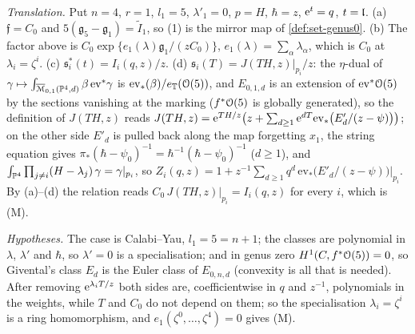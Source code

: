 \emph{Translation.} Put $n=4$, $r=1$, $l_1=5$, $\lambda'_1=0$, $p=H$, $\hbar=z$, $\mathrm{e}^t=q$, $t=\mathfrak{l}$. (a) $\mathfrak f=C_0$ and $5(\mathfrak g_5-\mathfrak g_1)=\tilde I_1$, so (1) is the mirror map of \cref{def:set-genus0}. (b) The factor above is $C_0\exp\{e_1(\lambda)\mathfrak g_1/(zC_0)\}$, $e_1(\lambda)=\sum_\alpha\lambda_\alpha$, which is $C_0$ at $\lambda_i=\zeta^i$. (c) $\mathfrak s_i^*(t)=I_i(q,z)/z$. (d) $\mathfrak s_i(T)=J(TH,z)|_{p_i}/z$: the $\eta$-dual of $\gamma\mapsto\int_{\overline{\mathcal M}_{0,1}(\mathbb{P}^4,d)}\beta\,\mathrm{ev}^*\gamma$ is $\mathrm{ev}_*(\beta)/e_{\mathbb{T}}(\mathcal{O}(5))$, and $E_{0,1,d}$ is an extension of $\mathrm{ev}^*\mathcal{O}(5)$ by the sections vanishing at the marking ($f^*\mathcal{O}(5)$ is globally generated), so the definition of $J(TH,z)$ reads $J(TH,z)=\mathrm{e}^{TH/z}\bigl(z+\sum_{d\geq1}\mathrm{e}^{dT}\mathrm{ev}_*\bigl(E'_d/(z-\psi)\bigr)\bigr)$; on the other side $E'_d$ is pulled back along the map forgetting $x_1$, the string equation gives $\pi_*(\hbar-\psi_0)^{-1}=\hbar^{-1}(\hbar-\psi_0)^{-1}$ ($d\geq1$), and $\int_{\mathbb{P}^4}\prod_{j\neq i}(H-\lambda_j)\,\gamma=\gamma|_{p_i}$, so $Z_i(q,z)=1+z^{-1}\sum_{d\geq1}q^d\,\mathrm{ev}_*\bigl(E'_d/(z-\psi)\bigr)|_{p_i}$. By (a)--(d) the relation reads $C_0\,J(TH,z)|_{p_i}=I_i(q,z)$ for every $i$, which is (M).

\emph{Hypotheses.} The case is Calabi--Yau, $l_1=5=n+1$; the classes are polynomial in $\lambda$, $\lambda'$ and $\hbar$, so $\lambda'=0$ is a specialisation; and in genus zero $H^1(C,f^*\mathcal{O}(5))=0$, so Givental's class $E_d$ is the Euler class of $E_{0,n,d}$ (convexity is all that is needed). After removing $\mathrm{e}^{\lambda_iT/z}$ both sides are, coefficientwise in $q$ and $z^{-1}$, polynomials in the weights, while $T$ and $C_0$ do not depend on them; so the specialisation $\lambda_i=\zeta^i$ is a ring homomorphism, and $e_1(\zeta^0,\dots,\zeta^4)=0$ gives (M).

